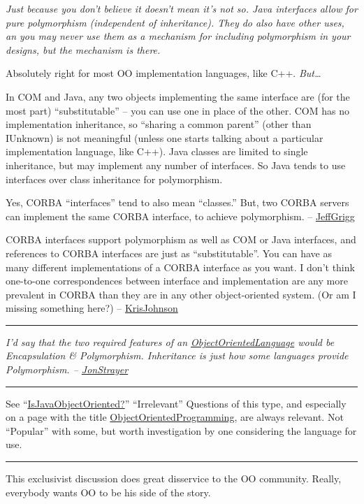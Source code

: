 \documentclass[10pt,twoside,openright]{memoir}
\begin{document}
\emph{Just because you don't believe it doesn't mean it's not so. Java interfaces allow for pure polymorphism (independent of inheritance). They do also have other uses, an you may never use them as a mechanism for including polymorphism in your designs, but the mechanism is there.}

Absolutely right for most OO implementation languages, like C++. \emph{But\dots}

In COM and Java, any two objects implementing the same interface are (for the most part) ``substitutable'' -- you can use one in place of the other. COM has no implementation inheritance, so ``sharing a common parent'' (other than IUnknown) is not meaningful (unless one starts talking about a particular implementation language, like C++). Java classes are limited to single inheritance, but may implement any number of interfaces. So Java tends to use interfaces over class inheritance for polymorphism.

Yes, CORBA ``interfaces'' tend to also mean ``classes.'' But, two CORBA servers can implement the same CORBA interface, to achieve polymorphism. -- \ul{JeffGrigg}

CORBA interfaces support polymorphism as well as COM or Java interfaces, and references to CORBA interfaces are just as ``substitutable''. You can have as many different implementations of a CORBA interface as you want. I don't think one-to-one correspondences between interface and implementation are any more prevalent in CORBA than they are in any other object-oriented system. (Or am I missing something here?) -- \ul{KrisJohnson}

\vskip 0.1in
\hrule
\vskip 0.1in

\emph{I'd say that the two required features of an \ul{ObjectOrientedLanguage} would be Encapsulation \& Polymorphism. Inheritance is just how some languages provide Polymorphism. -- \ul{JonStrayer}}

\vskip 0.1in
\hrule
\vskip 0.1in

See ``\ul{IsJavaObjectOriented?}'' ``Irrelevant'' Questions of this type, and especially on a page with the title \ul{ObjectOrientedProgramming}, are always relevant. Not ``Popular'' with some, but worth investigation by one considering the language for use.

\vskip 0.1in
\hrule
\vskip 0.1in

This exclusivist discussion does great disservice to the OO community. Really, everybody wants OO to be his side of the story.
\end{document}
